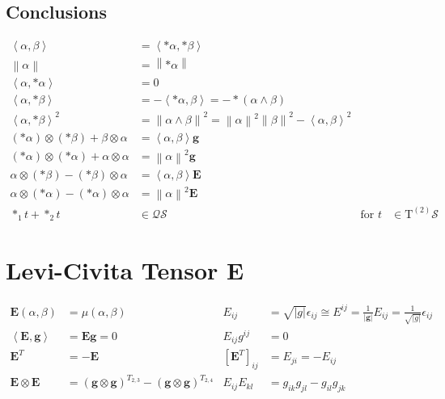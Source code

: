 \documentclass[a4paper,7pt]{scrartcl}
\newcommand{\surf}{\mathcal{S}}
\newcommand{\T}{\mathrm{T}}
\newcommand{\tps}[1]{\T^{(#1)}\surf}
\newcommand{\tts}{\tps{2}}
\newcommand{\qts}{\mathcal{Q}\surf}
\newcommand{\volval}{\sqrt{| g |}}
\newcommand{\gb}{\mathbf{g}}
\newcommand{\Eb}{\mathbf{E}}
\begin{document}
\subsection{Conclusions}
  \begin{align*}
    \left\langle \alpha, \beta \right\rangle &= \left\langle *\alpha , *\beta \right\rangle \\
    \left\| \alpha \right\| &= \left\| *\alpha \right\|\\
    \left\langle \alpha, *\alpha \right\rangle &= 0 \\
    \left\langle \alpha, *\beta \right\rangle &= -\left\langle *\alpha , \beta \right\rangle = -*\left( \alpha \wedge \beta \right)\\
    \left\langle \alpha, *\beta \right\rangle^{2} &= \left\| \alpha \wedge \beta \right\|^{2}
                                                    =\left\| \alpha \right\|^{2}\left\| \beta \right\|^{2} - \left\langle \alpha, \beta \right\rangle^{2}\\
    (*\alpha)\otimes(*\beta) + \beta\otimes\alpha &= \left\langle \alpha, \beta \right\rangle \gb \\
    (*\alpha)\otimes(*\alpha) + \alpha\otimes\alpha &= \left\| \alpha \right\|^{2} \gb \\
    \alpha\otimes(*\beta) - (*\beta)\otimes\alpha &= \left\langle \alpha, \beta \right\rangle \Eb \\
    \alpha\otimes(*\alpha) - (*\alpha)\otimes\alpha &=  \left\| \alpha \right\|^{2} \Eb\\
    *_{1}t+*_{2}t &\in \qts &\text{for } t &\in\tts
  \end{align*}

\section{Levi-Civita Tensor \( \Eb \)}

\begin{align*}
  \Eb(\alpha,\beta) &= \mu(\alpha,\beta)
          &E_{ij} &= \sqrt{|g|}\epsilon_{ij}
              \cong E^{ij} = \frac{1}{|\gb|}E_{ij} = \frac{1}{\volval}\epsilon_{ij} \\
  \left\langle \Eb, \gb \right\rangle &= \Eb\gb = 0
          &E_{ij}g^{ij} &= 0\\
  \Eb^{T} &= -\Eb 
           &\left[ \Eb^{T} \right]_{ij} &= E_{ji} = -E_{ij} \\
  \Eb\otimes\Eb &= \left( \gb\otimes\gb\right)^{T_{2,3}} - \left( \gb\otimes\gb\right)^{T_{2,4}}
           &E_{ij}E_{kl} &= g_{ik}g_{jl} - g_{il}g_{jk}
\end{align*}
\end{document}
